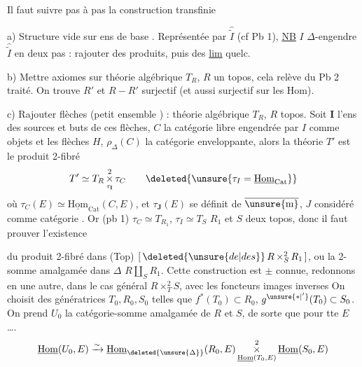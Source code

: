 
 Il faut suivre pas à pas la construction transfinie

a) Structure vide sur ens de base . Représentée par $\widehat{\widetilde I}$ (cf Pb 1),   \uline{NB} $I$ $\Delta$-engendre $\widehat{\widetilde I}$ en deux pas : rajouter des produits, puis des \uline{lim} quelc.

b)  Mettre axiomes sur théorie algébrique $T_R$, $R$ un topos, cela relève du Pb 2 traité. On trouve $R'$ et $R-R'$  surjectif (et aussi surjectif sur les Hom).

c) Rajouter flèches (petit ensemble ) :  théorie algébrique $T_R$, $R$  topos.  Soit  $\mathbf I$  l'ens des sources et buts de ces flèches, $C$ la catégorie libre engendrée par  $I$ comme objets et les flèches $H$, $\rho_\Delta(C)$ la catégorie enveloppante, alors la théorie $T'$ est le produit 2-fibré
\[
 T'\simeq T_R\mathop{\times}^{2}_{\tau_{\mathbf I}}\tau_C
 \qquad \deleted{\unsure{\tau_I=\underline{\mathrm{Hom}}_{\mathrm{Cat}}}}
\]
où $\tau_C(E)\simeq\underline{\mathrm{Hom}}_{\mathrm{Cat}}(C,E)$, et $\tau_{\mathbf J}(E)$ se définit de $\overline{\unsure{\mathrm m}}$, $J$ considéré comme catégorie . Or (pb 1) $\tau_C\simeq T_{R_1}$, $\tau_I\simeq T_S$ $R_1$ et $S$ deux topos, donc il faut prouver l'existence

du produit 2-fibré dans (Top) $[\,\deleted{\unsure{de|des}}\,R\mathop{\times}^{2}_{S}R_1\,]$, ou la 2-somme amalgamée dans $\Delta$ \quad $R\amalg_S R_1$. Cette construction est $\pm$ connue, redonnons en une autre, dans le cas général $R\mathop{\times}^{2}_{T}S$, avec les foncteurs images inverses
On choisit des   génératrices $T_0,R_0,S_0$ telles que $f^*(T_0)\subset R_0$, $g^{\unsure{*|'}}(T_0)\subset S_0$. On prend $U_0$ la catégorie-somme amalgamée de $R$ et $S$, de sorte que pour tte  $E$  \ldots .
\[
 \underline{\mathrm{Hom}}(U_0,E)\xrightarrow{\sim}
 \underline{\mathrm{Hom}}_{\deleted{\unsure{\Delta}}}(R_0,E)
 \mathop{\times}^{2}_{\underline{\mathrm{Hom}}(T_0,E)}
 \underline{\mathrm{Hom}}(S_0,E)
\]

